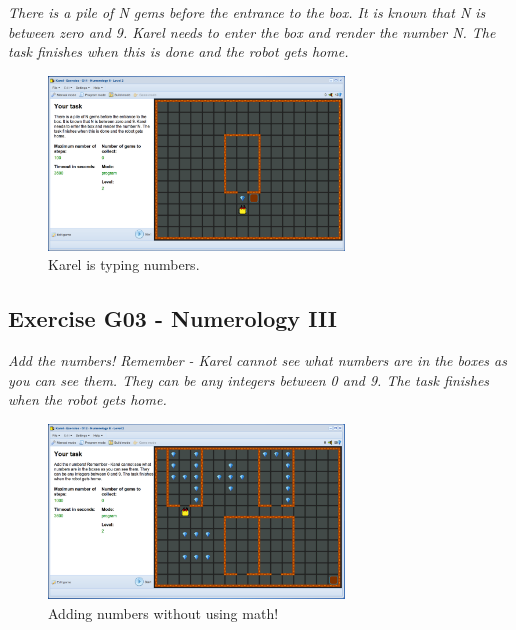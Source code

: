 \documentclass[article,A4,12pt]{llncs}
\begin{document}
{\em There is a pile of N gems before the entrance to the box. It is known that N is between zero and 9. Karel needs to enter the box and render the number N. The task finishes when this is done and the robot gets home.}

\newpage
\begin{figure}[!ht]
\begin{center}
\includegraphics[width=0.7\textwidth]{img/g11.png}
\end{center}
\vspace{-4mm}
\caption{Karel is typing numbers.}
\label{fig:g11}
\vspace{-4mm}
\end{figure}
\noindent

\subsection{Exercise G03 - Numerology III}

{\em Add the numbers! Remember - Karel cannot see what numbers are in the boxes as you can see them. They can be any integers between 0 and 9. The task finishes when the robot gets home.}


\begin{figure}[!ht]
\begin{center}
\includegraphics[width=0.7\textwidth]{img/g12.png}
\end{center}
\vspace{-4mm}
\caption{Adding numbers without using math!}
\label{fig:g12}
\vspace{-4mm}
\end{figure}
\noindent
\end{document}
